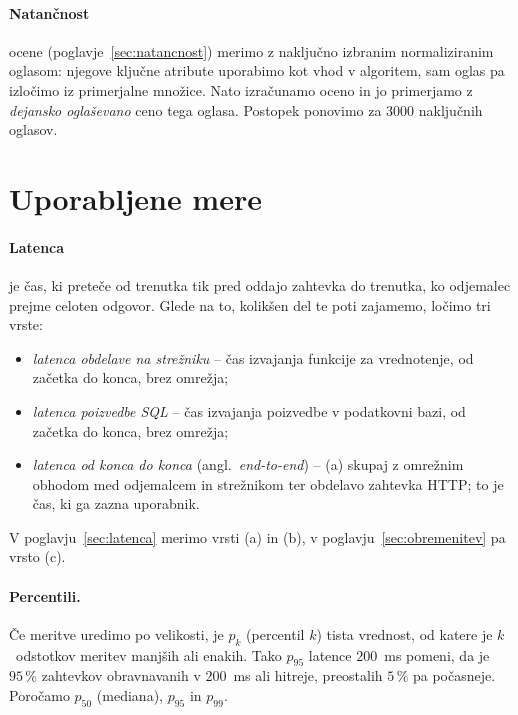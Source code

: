 \paragraph{Natančnost}
ocene (poglavje~\ref{sec:natancnost}) merimo z naključno izbranim
normaliziranim oglasom: njegove ključne atribute uporabimo kot vhod v algoritem,
sam oglas pa izločimo iz primerjalne množice. Nato izračunamo oceno in jo
primerjamo z \emph{dejansko oglaševano} ceno tega oglasa. Postopek ponovimo za
$3000$ naključnih oglasov.

\section{Uporabljene mere}
\label{sec:mere}

\paragraph{Latenca}
 je čas, ki preteče od trenutka tik pred oddajo zahtevka do
trenutka, ko odjemalec prejme celoten odgovor. Glede na to, kolikšen del te
poti zajamemo, ločimo tri vrste:
\begin{itemize}
  \item[(a)] \emph{latenca obdelave na strežniku} -- čas izvajanja funkcije
        za vrednotenje, od začetka do konca, brez omrežja;
  \item[(b)] \emph{latenca poizvedbe SQL} -- čas izvajanja poizvedbe v podatkovni bazi,
   od začetka do konca, brez omrežja;
  \item[(c)] \emph{latenca od konca do konca} (angl.\ \emph{end-to-end}) --
        (a) skupaj z omrežnim obhodom med odjemalcem in strežnikom ter
        obdelavo zahtevka HTTP; to je čas, ki ga zazna uporabnik.
\end{itemize}
V poglavju~\ref{sec:latenca} merimo vrsti (a) in (b), v
poglavju~\ref{sec:obremenitev} pa vrsto (c).

\paragraph{Percentili.}
Če meritve uredimo po velikosti, je $p_k$ (percentil $k$) tista vrednost, od
katere je $k$~odstotkov meritev manjših ali enakih. Tako $p_{95}$ latence
$200$~ms pomeni, da je $95\,\%$ zahtevkov obravnavanih v $200$~ms ali hitreje,
preostalih $5\,\%$ pa počasneje. Poročamo $p_{50}$ (mediana), $p_{95}$ in
$p_{99}$.

